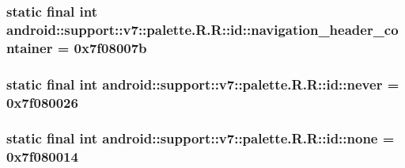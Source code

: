 \hypertarget{classandroid_1_1support_1_1v7_1_1palette_1_1_r_1_1id_3be168b068764434a765099ba7f3a846}{
\subsubsection[{navigation\_\-header\_\-container}]{\setlength{\rightskip}{0pt plus 5cm}static final int android::support::v7::palette.R.R::id::navigation\_\-header\_\-container = 0x7f08007b}}
\label{classandroid_1_1support_1_1v7_1_1palette_1_1_r_1_1id_3be168b068764434a765099ba7f3a846}


\hypertarget{classandroid_1_1support_1_1v7_1_1palette_1_1_r_1_1id_22899744825926944af4aa2b31a65d5f}{
\subsubsection[{never}]{\setlength{\rightskip}{0pt plus 5cm}static final int android::support::v7::palette.R.R::id::never = 0x7f080026}}
\label{classandroid_1_1support_1_1v7_1_1palette_1_1_r_1_1id_22899744825926944af4aa2b31a65d5f}


\hypertarget{classandroid_1_1support_1_1v7_1_1palette_1_1_r_1_1id_4c8a24662848ab758f453710f06657c6}{
\subsubsection[{none}]{\setlength{\rightskip}{0pt plus 5cm}static final int android::support::v7::palette.R.R::id::none = 0x7f080014}}
\label{classandroid_1_1support_1_1v7_1_1palette_1_1_r_1_1id_4c8a24662848ab758f453710f06657c6}


